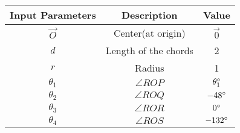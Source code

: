  \begin{tabular}{|c|c|c|}
    \hline
    \textbf{Input Parameters} &\textbf{Description} &\textbf{Value} \\
    \hline
     $\vec{O}$& Center(at origin)&$\vec{0}$\\
     \hline
$d$&Length of the chords &2\\
 \hline
 $r$ & Radius &1\\
 \hline
 $\theta_1$&$\angle ROP$&$\theta_1\degree$\\
 \hline
 $\theta_2$&$\angle ROQ$&$-48\degree$\\
 \hline
 $\theta_3$&$\angle ROR $&$0\degree$\\
 \hline
 $\theta_4$&$\angle ROS $&$-132\degree$\\
 \hline
 
    \end{tabular}

